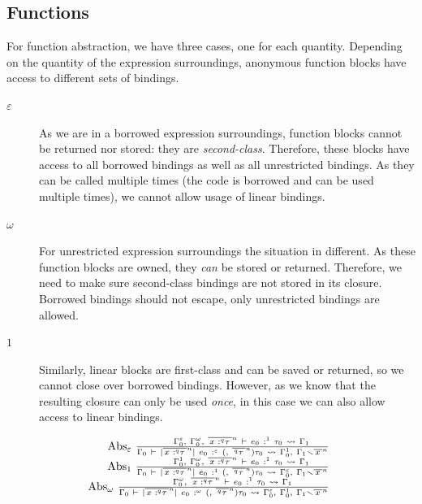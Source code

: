 \subsection{Functions}

For function abstraction, we have three cases, one for each quantity.
Depending on the quantity of the expression surroundings, anonymous
function blocks have access to different sets of bindings.

\begin{description}
\item[\(\varepsilon\)]
As we are in a borrowed expression surroundings, function blocks cannot
be returned nor stored: they are \emph{second-class}. Therefore, these
blocks have access to all borrowed bindings as well as all unrestricted
bindings. As they can be called multiple times (the code is borrowed and
can be used multiple times), we cannot allow usage of linear bindings.
\item[\(\omega\)]
For unrestricted expression surroundings the situation in different. As
these function blocks are owned, they \emph{can} be stored or returned.
Therefore, we need to make sure second-class bindings are not stored in
its closure. Borrowed bindings should not escape, only unrestricted
bindings are allowed.
\item[\(1\)]
Similarly, linear blocks are first-class and can be saved or returned,
so we cannot close over borrowed bindings. However, as we know that the
resulting closure can only be used \emph{once}, in this case we can also
allow access to linear bindings.
\end{description}

\[\begin{array}{r}
{\text{Abs}_{\varepsilon}\ \frac{\text{\quad\quad}{\Gamma_{0}^{\varepsilon}{,\ }\Gamma_{0}^{\omega}{,\ }{\overline{\,{x\text{ :}^{q}\tau}\:}}^{n}\  \vdash \ e_{0}\ :^{1}\ \tau_{0}\  \rightsquigarrow \ \Gamma_{1}}}{\Gamma_{0}\  \vdash \ {|{\overline{\,{x\text{ :}^{q}\tau}\:}}^{n}|\ e_{0}}\ :^{\varepsilon}\ {({,\ }{\overline{\,{{}^{q}\tau}\:}}^{n})\tau_{0}}\  \rightsquigarrow \ \Gamma_{0}^{1}{,\ }\Gamma_{1} \smallsetminus {\overline{\, x\:}}^{n}}\ } \\
{\text{Abs}_{1}\ \frac{\text{\quad\quad}{\Gamma_{0}^{1}{,\ }\Gamma_{0}^{\omega}{,\ }{\overline{\,{x\text{ :}^{q}\tau}\:}}^{n}\  \vdash \ e_{0}\ :^{1}\ \tau_{0}\  \rightsquigarrow \ \Gamma_{1}}}{\Gamma_{0}\  \vdash \ {|{\overline{\,{x\text{ :}^{q}\tau}\:}}^{n}|\ e_{0}}\ :^{1}\ {({,\ }{\overline{\,{{}^{q}\tau}\:}}^{n})\tau_{0}}\  \rightsquigarrow \ \Gamma_{0}^{\varepsilon}{,\ }\Gamma_{1} \smallsetminus {\overline{\, x\:}}^{n}}\ } \\
{\text{Abs}_{\omega}\ \frac{\text{\quad\quad}{\Gamma_{0}^{\omega}{,\ }{\overline{\,{x\text{ :}^{q}\tau}\:}}^{n}\  \vdash \ e_{0}\ :^{1}\ \tau_{0}\  \rightsquigarrow \ \Gamma_{1}}}{\Gamma_{0}\  \vdash \ {|{\overline{\,{x\text{ :}^{q}\tau}\:}}^{n}|\ e_{0}}\ :^{\omega}\ {({,\ }{\overline{\,{{}^{q}\tau}\:}}^{n})\tau_{0}}\  \rightsquigarrow \ \Gamma_{0}^{\varepsilon}{,\ }\Gamma_{0}^{1}{,\ }\Gamma_{1} \smallsetminus {\overline{\, x\:}}^{n}}\ }
\end{array}\]

